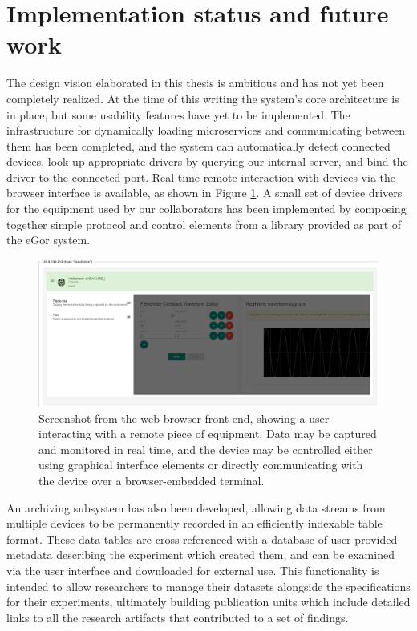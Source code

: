 \documentclass[../thesis]{subfiles}
\begin{document}
\section{Implementation status and future work}
The design vision elaborated in this thesis is ambitious and has not
yet been completely realized. At the time of this writing the system's
core architecture is in place, but some usability features have yet to
be implemented. The infrastructure for dynamically loading
microservices and communicating between them has been completed, and
the system can automatically detect connected devices, look up
appropriate drivers by querying our internal server, and bind the
driver to the connected port. Real-time remote interaction with
devices via the browser interface is available, as shown in Figure
\ref{fig:browser-interface}. A small set of device drivers for the
equipment used by our collaborators has been implemented by composing
together simple protocol and control elements from a library provided
as part of the eGor system.

\begin{figure}
  \includegraphics[width=\textwidth]{images/control-panels}
  \caption[User interface screenshot]{
    Screenshot from the web browser front-end, showing a user
    interacting with a remote piece of equipment. Data may be captured
    and monitored in real time, and the device may be controlled
    either using graphical interface elements or directly
    communicating with the device over a browser-embedded terminal.
    \label{fig:browser-interface}
  }
\end{figure}

An archiving subsystem has also been developed, allowing data streams
from multiple devices to be permanently recorded in an efficiently
indexable table format. These data tables are cross-referenced with a
database of user-provided metadata describing the experiment which
created them, and can be examined via the user interface and
downloaded for external use. This functionality is intended to allow
researchers to manage their datasets alongside the specifications for
their experiments, ultimately building publication units which include
detailed links to all the research artifacts that contributed to a set
of findings.
\end{document}
